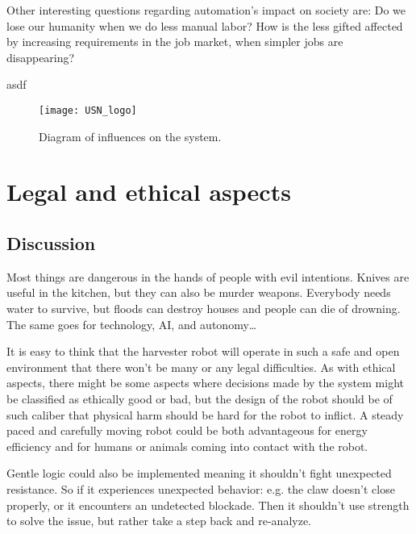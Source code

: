 \documentclass[%
oneside,    %
project,    %
nosummary   %
]{USN-MSc}
\begin{document}
Other interesting questions regarding automation's impact on society are:
Do we lose our humanity when we do less manual labor?
How is the less gifted affected by increasing requirements in the job market, when simpler jobs are disappearing?


asdf

\begin{figure}[!ht]
   \centering
  \texttt{[image: USN\_logo]}
  \caption{Diagram of influences on the system.}
  \label{fig:diagramInfluences}
\end{figure}


\chapter{Legal and ethical aspects}
\label{ch:legal}

\section{Discussion}
\label{sec:legalEthicalAspects}

Most things are dangerous in the hands of people with evil intentions. Knives are useful in the kitchen,
but they can also be murder weapons. Everybody needs water to survive, but floods can destroy houses and people can die of drowning.
The same goes for technology, AI, and autonomy\dots

It is easy to think that the harvester robot will operate in such a safe and open environment that there won't be many or any legal difficulties.
As with ethical aspects, there might be some aspects where decisions made by the system might be classified as ethically good or bad,
but the design of the robot should be of such caliber that physical harm should be hard for the robot to inflict. 
A steady paced and carefully moving robot could be both advantageous for energy efficiency and for humans or animals coming into contact with the robot.

Gentle logic could also be implemented meaning it shouldn't fight unexpected resistance. 
So if it experiences unexpected behavior: e.g. the claw doesn't close properly, or it encounters an undetected blockade.
Then it shouldn't use strength to solve the issue, but rather take a step back and re-analyze.
\end{document}

